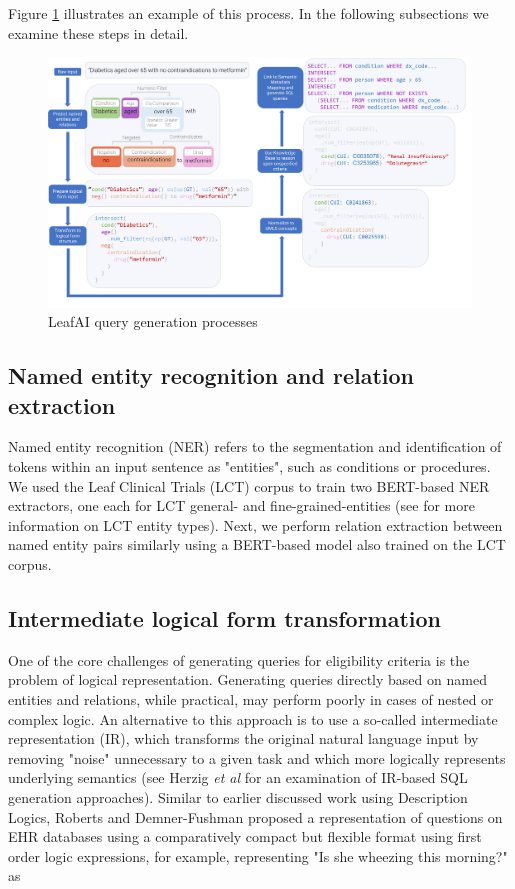 \documentclass[../main.tex]{subfiles}
\begin{document}
\noindent Figure \ref{fig_leafai_querygen} illustrates an example of this process. In the following subsections we examine these steps in detail.

\begin{figure}[h]
  \includegraphics[scale=0.47]{figures/leafai_flow.pdf}  
\caption{LeafAI query generation processes}
\label{fig_leafai_querygen}
\end{figure}

\subsection*{Named entity recognition and relation extraction}

\noindent Named entity recognition (NER) refers to the segmentation and identification of tokens within an input sentence as "entities", such as conditions or procedures. We used the Leaf Clinical Trials (LCT) corpus \cite{dobbins2022leaf} to train two BERT-based \cite{devlin2018bert} NER extractors, one each for LCT general- and fine-grained-entities (see \cite{dobbins2022leaf} for more information on LCT entity types). Next, we perform relation extraction between named entity pairs similarly using a BERT-based model also trained on the LCT corpus.

\subsection*{Intermediate logical form transformation}

\noindent One of the core challenges of generating queries for eligibility criteria is the problem of logical representation. Generating queries directly based on named entities and relations, while practical, may perform poorly in cases of nested or complex logic. An alternative to this approach is to use a so-called intermediate representation (IR), which transforms the original natural language input by removing "noise" unnecessary to a given task and which more logically represents underlying semantics (see Herzig \textit{et al} \cite{herzig2021unlocking} for an examination of IR-based SQL generation approaches). Similar to earlier discussed work using Description Logics, Roberts and Demner-Fushman \cite{roberts2016annotating} proposed a representation of questions on EHR databases using a comparatively compact but flexible format using first order logic expressions, for example, representing "Is she wheezing this morning?" as
\end{document}
